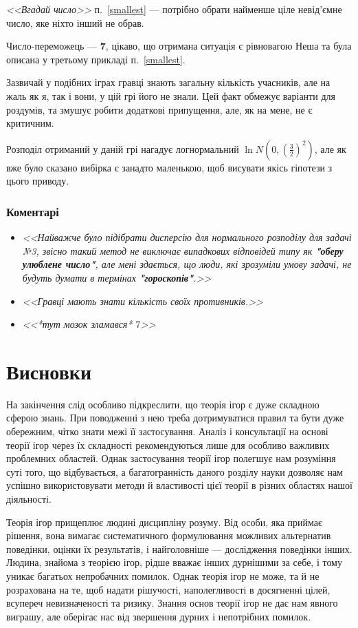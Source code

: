 \documentclass[a4paper]{article}
\begin{document}
\textit{<<Вгадай число>>} п.~\ref{smallest} — потрібно обрати найменше ціле невід'ємне число, яке ніхто інший не обрав.

Число-переможець — \textbf{7}, цікаво, що отримана ситуація є рівновагою Неша та була описана у третьому прикладі п.~\ref{smallest}.

Зазвичай у подібних іграх гравці знають загальну кількість учасників, але на жаль як я, так і вони, у цій грі його не знали. Цей факт обмежує варіанти для роздумів, та змушує робити додаткові припущення, але, як на мене, не є критичним.

Розподіл отриманий у даній грі нагадує логнормальний $\ln N\left(0 , \left(\frac{3}{2}\right)^{2}\right)$, але як вже було сказано вибірка є занадто маленькою, щоб висувати якісь гіпотези з цього приводу.


\subsubsection*{Коментарі}
\begin{itemize}
    \item \textit{<<Найважче було підібрати дисперсію для нормального розподілу для задачі №3, звісно такий метод не виключає випадкових відповідей типу як \textbf{"оберу улюблене число"}, але мені здається, що люди, які зрозуміли умову задачі, не будуть думати в термінах \textbf{"гороскопів"}.>>}
    \item \textit{<<Гравці мають знати кількість своїх противників.>>}
    \item \textit{<<*тут мозок зламався* $7$>>}
\end{itemize}

\clearpage
\section{Висновки}

На закінчення слід особливо підкреслити, що теорія ігор є дуже складною сферою знань. При поводженні з нею треба дотримуватися правил та бути дуже обережним, чітко знати межі її застосування. Аналіз і консультації на основі теорії ігор через їх складності рекомендуються лише для особливо важливих проблемних областей. Однак застосування теорії ігор полегшує нам розуміння суті того, що відбувається, а багатогранність даного розділу науки дозволяє нам успішно використовувати методи й властивості цієї теорії в різних областях нашої діяльності.

Теорія ігор прищеплює людині дисципліну розуму. Від особи, яка приймає рішення, вона вимагає систематичного формулювання можливих альтернатив поведінки, оцінки їх результатів, і найголовніше — дослідження поведінки інших. Людина, знайома з теорією ігор, рідше вважає інших дурнішими за себе, і тому уникає багатьох непробачних помилок. Однак теорія ігор не може, та й не розрахована на те, щоб надати рішучості, наполегливості в досягненні цілей, всупереч невизначеності та ризику. Знання основ теорії ігор не дає нам явного виграшу, але оберігає нас від звершення дурних і непотрібних помилок.
\end{document}
